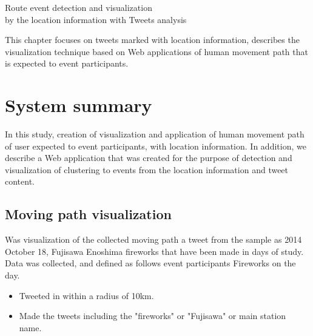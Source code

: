\chapterhead
{Route event detection and visualization\\
by the location information with Tweets analysis}

{This chapter focuses on tweets marked with location information, describes the visualization technique based on Web applications of human movement path that is expected to event participants.}


\section{System summary}
In this study, creation of visualization and application of human movement path of user expected to event participants, with location information.
In addition, we describe a Web application that was created for the purpose of detection and visualization of clustering to events from the location information and tweet content.

\subsection{Moving path visualization}
Was visualization of the collected moving path a tweet from the sample as 2014 October 18, Fujisawa Enoshima fireworks \cite{webpage_fujisawa} that have been made in days of study.
Data was collected, and defined as follows event participants Fireworks on the day.
\begin{itemize}
    \item Tweeted in within a radius of 10km.
    \item Made the tweets including the "fireworks" or "Fujisawa" or main station name.
\end{itemize}

